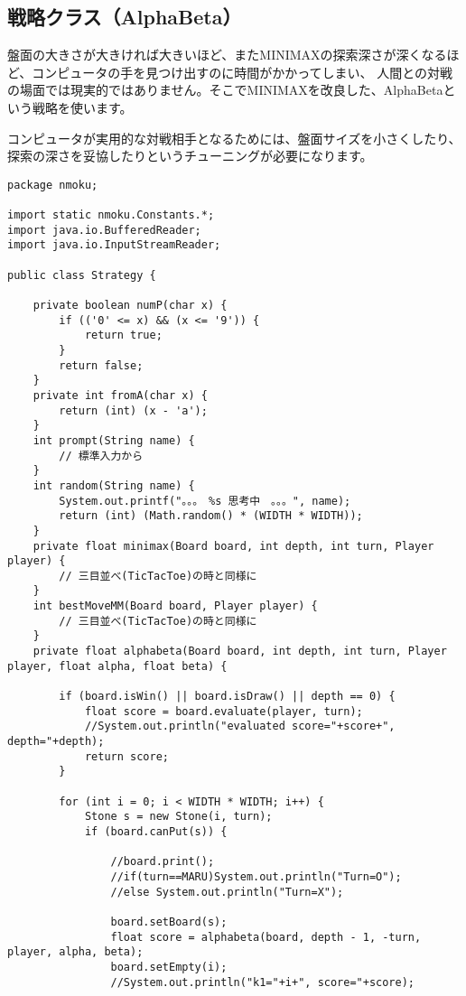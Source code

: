 \documentclass[uplatex,a4paper,11pt,oneside,openany]{jsbook}
\begin{document}
\subsection{戦略クラス（AlphaBeta）}

盤面の大きさが大きければ大きいほど、またMINIMAXの探索深さが深くなるほど、コンピュータの手を見つけ出すのに時間がかかってしまい、
人間との対戦の場面では現実的ではありません。そこでMINIMAXを改良した、AlphaBetaという戦略を使います。

コンピュータが実用的な対戦相手となるためには、盤面サイズを小さくしたり、探索の深さを妥協したりというチューニングが必要になります。

\begin{lstlisting}[caption=戦略クラス：N目並べ,label=prog31]
package nmoku;

import static nmoku.Constants.*;
import java.io.BufferedReader;
import java.io.InputStreamReader;

public class Strategy {

    private boolean numP(char x) {
        if (('0' <= x) && (x <= '9')) {
            return true;
        }
        return false;
    }
    private int fromA(char x) {
        return (int) (x - 'a');
    }
    int prompt(String name) {
        // 標準入力から
    }
    int random(String name) {
        System.out.printf("。。。　%s 思考中　。。。", name);
        return (int) (Math.random() * (WIDTH * WIDTH));
    }
    private float minimax(Board board, int depth, int turn, Player player) {
        // 三目並べ(TicTacToe)の時と同様に
    }
    int bestMoveMM(Board board, Player player) {
        // 三目並べ(TicTacToe)の時と同様に
    }
    private float alphabeta(Board board, int depth, int turn, Player player, float alpha, float beta) {

        if (board.isWin() || board.isDraw() || depth == 0) {
            float score = board.evaluate(player, turn);
            //System.out.println("evaluated score="+score+", depth="+depth);
            return score;
        }

        for (int i = 0; i < WIDTH * WIDTH; i++) {
            Stone s = new Stone(i, turn);
            if (board.canPut(s)) {

                //board.print();
                //if(turn==MARU)System.out.println("Turn=O");
                //else System.out.println("Turn=X");

                board.setBoard(s);
                float score = alphabeta(board, depth - 1, -turn, player, alpha, beta);
                board.setEmpty(i);
                //System.out.println("k1="+i+", score="+score);


\end{lstlisting}
\end{document}
